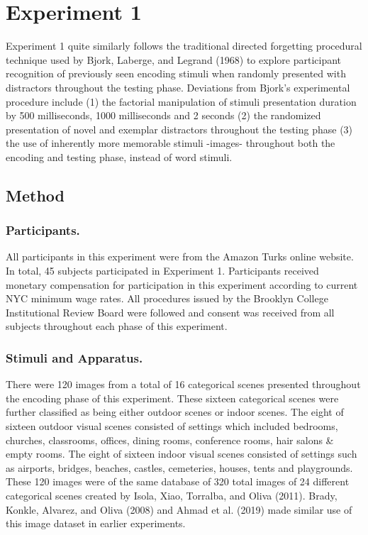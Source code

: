 \documentclass[
  english,
  man,floatsintext]{apa6}
\begin{document}
\hypertarget{experiment-1}{%
\section{Experiment 1}\label{experiment-1}}

Experiment 1 quite similarly follows the traditional directed forgetting procedural technique used by Bjork, Laberge, and Legrand (1968) to explore participant recognition of previously seen encoding stimuli when randomly presented with distractors throughout the testing phase. Deviations from Bjork's experimental procedure include (1) the factorial manipulation of stimuli presentation duration by 500 milliseconds, 1000 milliseconds and 2 seconds (2) the randomized presentation of novel and exemplar distractors throughout the testing phase (3) the use of inherently more memorable stimuli -images- throughout both the encoding and testing phase, instead of word stimuli.

\hypertarget{method}{%
\subsection{Method}\label{method}}

\hypertarget{participants.}{%
\subsubsection{Participants.}\label{participants.}}

All participants in this experiment were from the Amazon Turks online website. In total, 45 subjects participated in Experiment 1. Participants received monetary compensation for participation in this experiment according to current NYC minimum wage rates. All procedures issued by the Brooklyn College Institutional Review Board were followed and consent was received from all subjects throughout each phase of this experiment.

\hypertarget{stimuli-and-apparatus.}{%
\subsubsection{Stimuli and Apparatus.}\label{stimuli-and-apparatus.}}

There were 120 images from a total of 16 categorical scenes presented throughout the encoding phase of this experiment. These sixteen categorical scenes were further classified as being either outdoor scenes or indoor scenes. The eight of sixteen outdoor visual scenes consisted of settings which included bedrooms, churches, classrooms, offices, dining rooms, conference rooms, hair salons \& empty rooms. The eight of sixteen indoor visual scenes consisted of settings such as airports, bridges, beaches, castles, cemeteries, houses, tents and playgrounds. These 120 images were of the same database of 320 total images of 24 different categorical scenes created by Isola, Xiao, Torralba, and Oliva (2011). Brady, Konkle, Alvarez, and Oliva (2008) and Ahmad et al. (2019) made similar use of this image dataset in earlier experiments.
\end{document}
